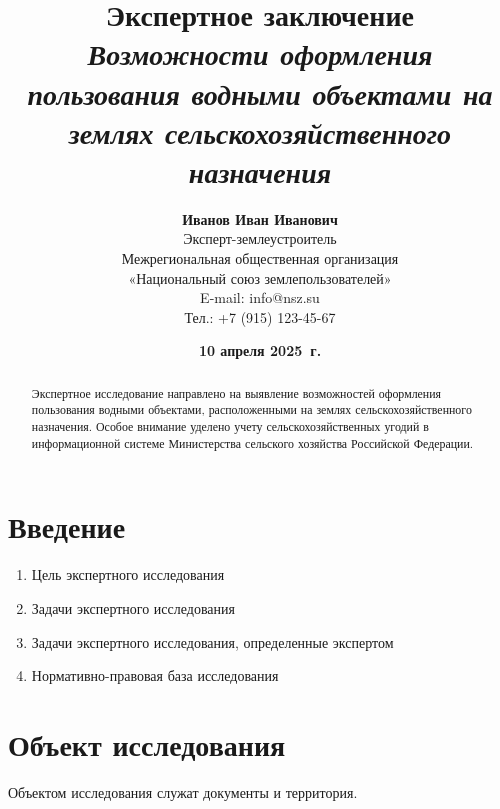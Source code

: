 \title{
    \LARGE\textbf{Экспертное заключение} \\
    \large\textit{Возможности оформления пользования водными объектами на землях сельскохозяйственного назначения}
}

\author{
    \small\textbf{Иванов Иван Иванович} \\[4pt]
    \footnotesize Эксперт-землеустроитель \\
    \footnotesize Межрегиональная общественная организация \\
    \footnotesize «Национальный союз землепользователей» \\[8pt]
    \footnotesize {E-mail: info@nsz.su} \\
    \footnotesize {Тел.: +7 (915) 123-45-67}
}

\date{
    \small\textbf{10 апреля 2025~г.} \\[4pt]
}

\pagestyle{fancy}
\maketitle

\begin{abstract}
Экспертное исследование направлено на выявление возможностей оформления пользования водными объектами, расположенными на землях сельскохозяйственного назначения. Особое внимание уделено учету сельскохозяйственных угодий в информационной системе Министерства сельского хозяйства Российской Федерации. 
\end{abstract}

\tableofcontents

\section{Введение}
\label{sec:intro}

\begin{enumerate}
    \item[] Цель экспертного исследования
    \item[] Задачи экспертного исследования
    \item[] Задачи экспертного исследования, определенные экспертом 
    \item[] Нормативно-правовая база исследования
\end{enumerate}

\section{Объект исследования}
\label{sec:obj}
Объектом исследования служат документы и территория. 

